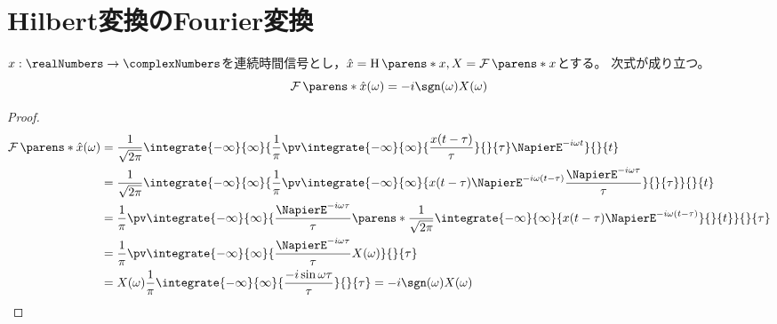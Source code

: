     \chapter{Hilbert変換のFourier変換}
        \begin{shadebox}
            $x:\realNumbers\to\complexNumbers$を連続時間信号とし，$\hat{x} = \HilbertTransform\parens*{x},X = \FT\parens*{x}$とする。
            次式が成り立つ。
            \[ \FT\parens*{\hat{x}}(\omega) = -i\sgn(\omega)X(\omega) \]
        \end{shadebox}
        \begin{proof}
            \begin{align*}
                \FT\parens*{\hat{x}}(\omega) &= \frac{1}{\sqrt{2\pi}}\integrate{-\infty}{\infty}{\frac{1}{\pi}\pv\integrate{-\infty}{\infty}{\frac{x(t-\tau)}{\tau}}{}{\tau}\NapierE^{-i\omega t}}{}{t} \\
                &= \frac{1}{\sqrt{2\pi}}\integrate{-\infty}{\infty}{\frac{1}{\pi}\pv\integrate{-\infty}{\infty}{x(t-\tau)\NapierE^{-i\omega(t-\tau)}\frac{\NapierE^{-i\omega \tau}}{\tau}}{}{\tau}}{}{t} \\
                &= \frac{1}{\pi}\pv\integrate{-\infty}{\infty}{\frac{\NapierE^{-i\omega \tau}}{\tau}\parens*{\frac{1}{\sqrt{2\pi}}\integrate{-\infty}{\infty}{x(t-\tau)\NapierE^{-i\omega(t-\tau)}}{}{t}}}{}{\tau} \\
                &= \frac{1}{\pi}\pv\integrate{-\infty}{\infty}{\frac{\NapierE^{-i\omega \tau}}{\tau}X(\omega)}{}{\tau} \\
                &= X(\omega)\frac{1}{\pi}\integrate{-\infty}{\infty}{\frac{-i\sin\omega\tau}{\tau}}{}{\tau} = -i\sgn(\omega)X(\omega)
            \end{align*}
        \end{proof}